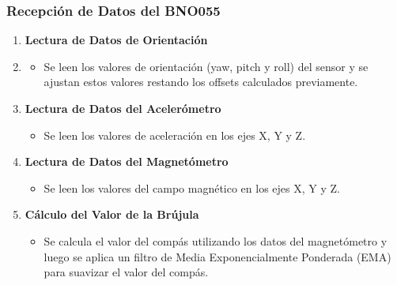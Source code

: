             \subsubsection{Recepción de Datos del BNO055}\vspace{5px}

            \begin{enumerate}
                \item \textbf{Lectura de Datos de Orientación}\vspace{5px}
                \item 
                \begin{itemize}
                    \item Se leen los valores de orientación (yaw, pitch y roll) del sensor y se ajustan estos valores restando los offsets calculados previamente.
                \end{itemize}\vspace{5px}

                \item \textbf{Lectura de Datos del Acelerómetro}\vspace{5px}
                
                \begin{itemize}
                    \item Se leen los valores de aceleración en los ejes X, Y y Z.
                \end{itemize}\vspace{5px}

                \item \textbf{Lectura de Datos del Magnetómetro}\vspace{5px}
                
                \begin{itemize}
                    \item Se leen los valores del campo magnético en los ejes X, Y y Z.
                \end{itemize}\vspace{5px}

                \item \textbf{Cálculo del Valor de la Brújula}\vspace{5px}
                \begin{itemize}
                    \item Se calcula el valor del compás utilizando los datos del magnetómetro y luego se aplica un filtro de Media Exponencialmente Ponderada (EMA) para suavizar el valor del compás.
                \end{itemize}\vspace{5px}
            \end{enumerate}



